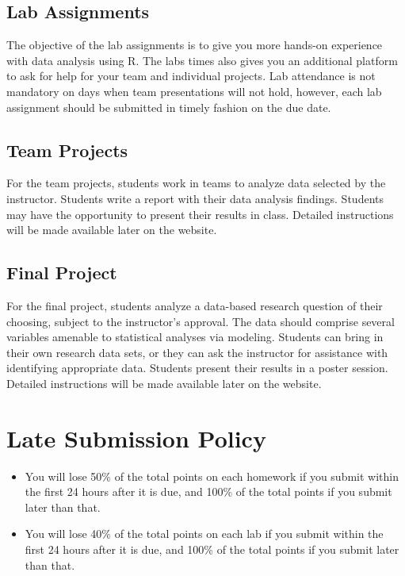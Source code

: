 \documentclass[11pt, a4paper]{article}
\begin{document}
\subsection{Lab Assignments}
The objective of the lab assignments is to give you more hands-on experience with data analysis using R. The labs times also gives you an additional platform to ask for help for your team and individual projects. Lab attendance is not mandatory on days when team presentations will not hold, however, each lab assignment should be submitted in timely fashion on the due date.

\subsection{Team Projects}
For the team projects, students work in teams to analyze data selected by the instructor. Students write a report with their data analysis findings. Students may have the opportunity to present their results in class. Detailed instructions will be made available later on the website.

\subsection{Final Project}
For the final project, students analyze a data-based research question of their choosing, subject to the instructor's approval. The data should comprise several variables amenable to statistical analyses via modeling. Students can bring in their own research data sets, or they can ask the instructor for assistance with identifying appropriate data. Students present their results in a poster session. Detailed instructions will be made available later on the website.


\section{Late Submission Policy} 
\begin{itemize}
	\item  You will lose 50\% of the total points on each homework if you submit within the first 24 hours after it is due, and 100\% of the total points if you submit later than that.
	\item You will lose 40\% of the total points on each lab if you submit within the first 24 hours after it is due, and 100\% of the total points if you submit later than that.
\end{itemize}
\end{document}
